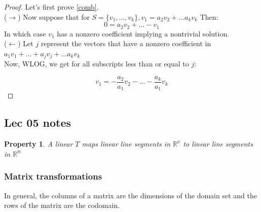 \documentclass{article}
\newtheorem{property}{Property}
\begin{document}
\begin{proof}
Let's first prove \ref{comb}.
\\
($\rightarrow$)
   Now suppose that for $S = \{ v_{1}, \ldots , v_{k}\}, v_{1} = a_{2}v_{2} + \ldots a_{k}v_{k}$ Then:
   $$ 0 = a_{2}v_{2} + \ldots - v_{1}$$
   In which case $v_{1}$ has a nonzero coefficient implying a nontrivial solution. 
   \\
($\leftarrow$)
Let $j$ represent the vectors that have a nonzero coefficient in $a_{1}v_{1} + \ldots + a_{j}v_{j} + \ldots a_{k}v_{k}$
\\
Now, WLOG, we get for all subscripts less than or equal to $j$:

$$ v_{1} = - \frac{a_{2}}{a_{1}}v_{2} - \ldots - \frac{a_{k}}{a_{1}}v_{k}$$
    \tag*{\qedhere}
\end{proof}

\subsection{Lec 05 notes}

\begin{property}
A linear $T$ maps linear line segments in $\mathbb{R^{n}}$ to linear line segments in $\mathbb{R^{m}}$ 
\end{property}

\subsubsection{Matrix transformations}

\begin{tcolorbox}
  In general, the columns of a matrix are the dimensions of the domain set and the rows of the matrix are the codomain. 
\end{tcolorbox}
\end{document}
